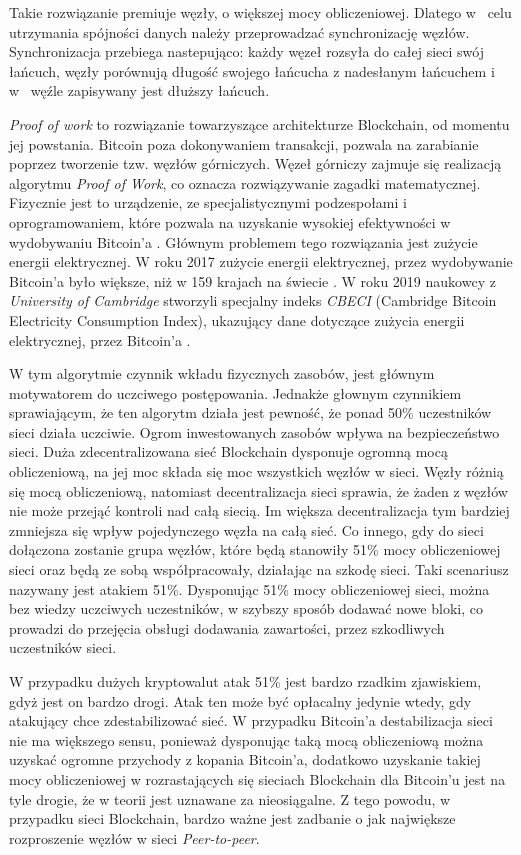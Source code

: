 \documentclass[a4paper,12pt]{book}
\begin{document}
Takie rozwiązanie premiuje węzły, o większej mocy obliczeniowej. Dlatego w~ celu utrzymania spójności danych należy przeprowadzać synchronizację węzłów. Synchronizacja przebiega nastepująco: każdy węzeł rozsyła do całej sieci swój łańcuch, węzły porównują długość swojego łańcucha z nadesłanym łańcuchem i w~ węźle zapisywany jest dłuższy łańcuch.

\textit{Proof of work} to rozwiązanie towarzyszące architekturze Blockchain, od momentu jej powstania. Bitcoin poza dokonywaniem transakcji, pozwala na zarabianie poprzez tworzenie tzw. węzłów górniczych. Węzeł górniczy zajmuje się realizacją algorytmu \textit{Proof of Work}, co oznacza rozwiązywanie zagadki matematycznej. Fizycznie jest to urządzenie, ze specjalistycznymi podzespołami i oprogramowaniem, które pozwala na uzyskanie wysokiej efektywności w wydobywaniu Bitcoin'a \cite{nodes}. Głównym problemem tego rozwiązania jest zużycie energii elektrycznej. W roku 2017 zużycie energii elektrycznej, przez wydobywanie Bitcoin'a było większe, niż w 159 krajach na świecie \cite{elctricity-bitcoin}. W roku 2019 naukowcy z \textit{University of Cambridge} stworzyli specjalny indeks \textit{CBECI} (Cambridge Bitcoin Electricity Consumption Index), ukazujący dane dotyczące zużycia energii elektrycznej, przez Bitcoin'a \cite{CBECI}.

W tym algorytmie czynnik wkładu fizycznych zasobów, jest głównym motywatorem do uczciwego postępowania. Jednakże głownym czynnikiem sprawiającym, że ten algorytm działa jest pewność, że ponad 50\% uczestników sieci działa uczciwie. Ogrom inwestowanych zasobów wpływa na bezpieczeństwo sieci. Duża zdecentralizowana sieć Blockchain dysponuje ogromną mocą obliczeniową, na jej moc składa się moc wszystkich węzłów w sieci. Węzły różnią się mocą obliczeniową, natomiast decentralizacja sieci sprawia, że żaden z węzłów nie może przejąć kontroli nad całą siecią. Im większa decentralizacja tym bardziej zmniejsza się wpływ pojedynczego węzła na całą sieć. Co innego, gdy do sieci dołączona zostanie grupa węzłów, które będą stanowiły 51\% mocy obliczeniowej sieci oraz będą ze sobą współpracowały, działając na szkodę sieci. Taki scenariusz nazywany jest atakiem 51\%. Dysponując 51\% mocy obliczeniowej sieci, można bez wiedzy uczciwych uczestników, w szybszy sposób dodawać nowe bloki, co prowadzi do przejęcia obsługi dodawania zawartości, przez szkodliwych uczestników sieci\cite{atack51}.

W przypadku dużych kryptowalut atak 51\% jest bardzo rzadkim zjawiskiem, gdyż jest on bardzo drogi. Atak ten może być opłacalny jedynie wtedy, gdy atakujący chce zdestabilizować sieć. W przypadku Bitcoin'a destabilizacja sieci nie ma większego sensu, ponieważ dysponując taką mocą obliczeniową można uzyskać ogromne przychody z kopania Bitcoin'a, dodatkowo uzyskanie takiej mocy obliczeniowej w rozrastających się sieciach Blockchain dla Bitcoin'u jest na tyle drogie, że w teorii jest uznawane za nieosiągalne. Z tego powodu, w przypadku sieci Blockchain, bardzo ważne jest zadbanie o jak największe rozproszenie węzłów w sieci \textit{Peer-to-peer}\cite{abpow}.
\end{document}
